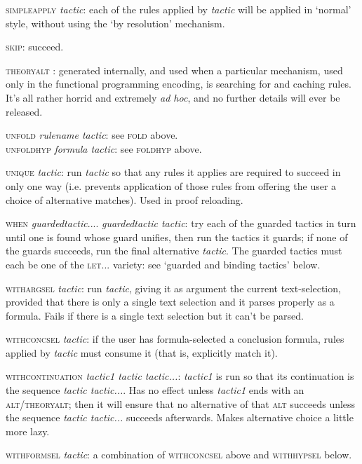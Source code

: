 \textsc{simpleapply} \textit{tactic}: each of the rules applied by \textit{tactic} will be applied in `normal' style, without using the `by resolution' mechanism.


\textsc{skip}: succeed.


\textsc{theoryalt} : generated internally, and used when a particular mechanism, used only in the functional programming encoding, is searching for and caching rules. It's all rather horrid and extremely \textit{ad hoc}, and no further details will ever be released.


\textsc{unfold} \textit{rulename tactic}: see \textsc{fold} above.\\
\textsc{unfoldhyp} \textit{formula tactic}: see \textsc{foldhyp} above.


\textsc{unique} \textit{tactic}: run \textit{tactic} so that any rules it applies are required to succeed in only one way (i.e. prevents application of those rules from offering the user a choice of alternative matches). Used in proof reloading.


\textsc{when} \textit{guardedtactic}.... \textit{guardedtactic tactic}: try each of the guarded tactics in turn until one is found whose guard unifies, then run the tactics it guards; if none of the guards succeeds, run the final alternative \textit{tactic}. The guarded tactics must each be one of the \textsc{let...} variety: see `guarded and binding tactics' below.


\textsc{withargsel} \textit{tactic}: run \textit{tactic}, giving it as argument the current text-selection, provided that there is only a single text selection and it parses properly as a formula. Fails if there is a single text selection but it can't be parsed.


\textsc{withconcsel} \textit{tactic}: if the user has formula-selected a conclusion formula, rules applied by \textit{tactic} must consume it (that is, explicitly match it).


\textsc{withcontinuation} \textit{tactic1 tactic tactic...}: \textit{tactic1} is run so that its continuation is the sequence \textit{tactic tactic...}. Has no effect unless \textit{tactic1} ends with an \textsc{alt/theoryalt}; then it will ensure that no alternative of that \textsc{alt} succeeds unless the sequence \textit{tactic tactic...} succeeds afterwards. Makes alternative choice a little more lazy.


\textsc{withformsel} \textit{tactic}: a combination of \textsc{withconcsel} above and \textsc{withhypsel} below.


